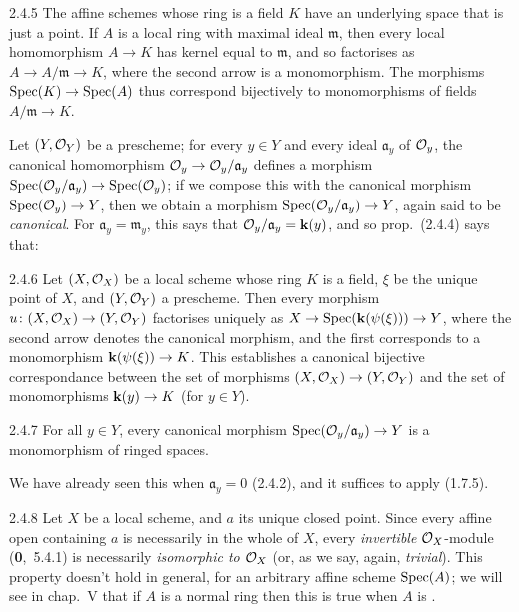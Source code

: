 \documentclass[../main.tex]{subfiles}
\begin{document}
    \begin{env}{2.4.5}
        The affine schemes whose ring is a field $K$ have an underlying space that is just a point.
        If $A$ is a local ring with maximal ideal $\mathfrak{m}$, then every local homomorphism $A\to K$ has kernel equal to $\mathfrak{m}$, and so factorises as $A\to A/\mathfrak{m}\to K$, where the second arrow is a monomorphism.
        The morphisms $\operatorname{Spec}(K)\to\operatorname{Spec}(A)$ thus correspond bijectively to monomorphisms of fields $A/\mathfrak{m}\to K$.
    \end{env}
    
    Let $(Y,\mathcal{O}_Y)$ be a prescheme; for every $y\in Y$ and every ideal $\mathfrak{a}_y$ of $\mathcal{O}_y$, the canonical homomorphism $\mathcal{O}_y\to\mathcal{O}_y/\mathfrak{a}_y$ defines a morphism $\operatorname{Spec}(\mathcal{O}_y/\mathfrak{a}_y)\to\operatorname{Spec}(\mathcal{O}_y)$; if we compose this with the canonical morphism $\operatorname{Spec}(\mathcal{O}_y)\to Y$, then we obtain a morphism $\operatorname{Spec}(\mathcal{O}_y/\mathfrak{a}_y)\to Y$, again said to be \textit{canonical}.
    For $\mathfrak{a}_y=\mathfrak{m}_y$, this says that $\mathcal{O}_y/\mathfrak{a}_y=\mathbf{k}(y)$, and so prop.~(2.4.4) says that:
    
    \begin{env}[Corollary]{2.4.6}
        Let $(X,\mathcal{O}_X)$ be a local scheme whose ring $K$ is a field, $\xi$ be the unique point of $X$, and $(Y,\mathcal{O}_Y)$ a prescheme.
        Then every morphism $u\colon(X,\mathcal{O}_X)\to(Y,\mathcal{O}_Y)$ factorises uniquely as $X\to\operatorname{Spec}(\mathbf{k}(\psi(\xi)))\to Y$, where the second arrow denotes the canonical morphism, and the first corresponds to a monomorphism $\mathbf{k}(\psi(\xi))\to K$.
        This establishes a canonical bijective correspondance between the set of morphisms $(X,\mathcal{O}_X)\to (Y,\mathcal{O}_Y)$ and the set of monomorphisms $\mathbf{k}(y)\to K$ (for $y\in Y$).
    \end{env}
    
    \begin{env}[Corollary]{2.4.7}
        For all $y\in Y$, every canonical morphism $\operatorname{Spec}(\mathcal{O}_y/\mathfrak{a}_y)\to Y$ is a monomorphism of ringed spaces.
    \end{env}
    
    We have already seen this when $\mathfrak{a}_y=0$ (2.4.2), and it suffices to apply (1.7.5).
    
    \begin{env}[Remark]{2.4.8}
        Let $X$ be a local scheme, and $a$ its unique closed point.
        Since every affine open containing $a$ is necessarily in the whole of $X$, every \emph{invertible} $\mathcal{O}_X$-module (\textbf{0},~5.4.1) is necessarily \emph{isomorphic to $\mathcal{O}_X$} (or, as we say, again, \emph{trivial}).
        This property doesn't hold in general, for an arbitrary affine scheme $\operatorname{Spec}(A)$; we will see in chap.~V that if $A$ is a normal ring then this is true when $A$ is .
    \end{env}
\end{document}
